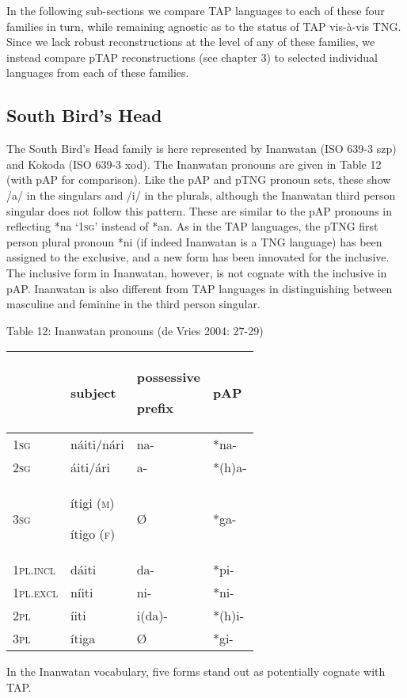In the following sub-sections we compare TAP languages to each of these four families in turn, while remaining agnostic as to the status of TAP vis-\`a-vis TNG. Since we lack robust reconstructions at the level of any of these families, we instead compare pTAP reconstructions (see chapter 3) to selected individual languages from each of these families.

\subsection[South Bird{\textquoteright}s Head]{South Bird{\textquoteright}s Head}
\hypertarget{RefHeading72082871885726}{}The South Bird{\textquoteright}s Head family is here represented by Inanwatan (ISO 639-3 szp) and Kokoda (ISO 639-3 xod). The Inanwatan pronouns are given in Table 12 (with pAP for comparison). Like the pAP and pTNG pronoun sets, these show /a/ in the singulars and /i/ in the plurals, although the Inanwatan third person singular does not follow this pattern. These are similar to the pAP pronouns in reflecting *na {\textquoteleft}\textsc{1sg}{\textquoteright} instead of *an. As in the TAP languages, the pTNG first person plural pronoun *ni (if indeed Inanwatan is a TNG language) has been assigned to the exclusive, and a new form has been innovated for the inclusive. The inclusive form in Inanwatan, however, is not cognate with the inclusive in pAP. Inanwatan is also different from TAP languages in distinguishing between masculine and feminine in the third person singular. 

{\centering
Table 12: Inanwatan pronouns (de Vries 2004: 27-29)
\par}

\begin{center}
\tablehead{}
\begin{supertabular}{|m{0.6941598in}|m{0.6733598in}|m{0.7754598in}|m{0.47885987in}|}
\hline
 &
subject &
possessive

prefix &
pAP\\\hline
\textsc{1sg} &
n\'aiti/n\'ari &
na- &
*na-\\\hline
\textsc{2sg} &
\'aiti/\'ari &
a- &
*(h)a-\\\hline
\textsc{3sg} &
\'itigi (\textsc{m})

\'itigo (\textsc{f}) &
{\O} &
*ga-\\\hline
\textsc{1pl.incl} &
d\'aiti &
da- &
*pi-\\\hline
\textsc{1pl.excl} &
n\'iiti &
ni- &
*ni-\\\hline
\textsc{2pl} &
\'iiti &
i(da)- &
*(h)i-\\\hline
\textsc{3pl} &
\'itiga &
{\O} &
*gi-\\\hline
\end{supertabular}
\end{center}
In the Inanwatan vocabulary, five forms stand out as potentially cognate with TAP. 

